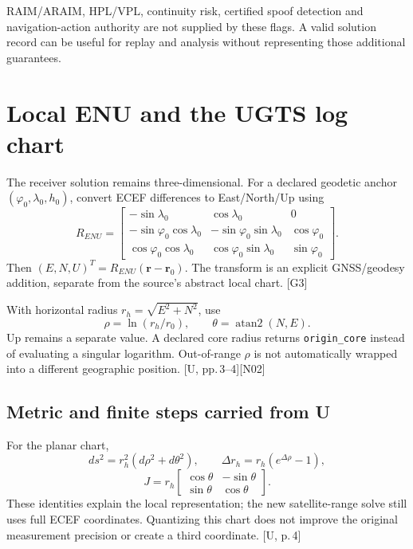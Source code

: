 \documentclass[11pt,a4paper]{article}
\newcommand{\code}[1]{\texttt{#1}}
\newcommand{\src}[1]{\textcolor{muted}{[U, #1]}}
\newcommand{\ext}[1]{\textcolor{muted}{[#1]}}
\newcommand{\dec}[1]{\textcolor{accent}{[N#1]}}
\begin{document}
RAIM/ARAIM, HPL/VPL, continuity risk, certified spoof detection and navigation-action
authority are not supplied by these flags. A valid solution record can be useful for
replay and analysis without representing those additional guarantees.
\clearpage
\section{Local ENU and the UGTS log chart}
The receiver solution remains three-dimensional. For a declared geodetic anchor
$(\varphi_0,\lambda_0,h_0)$, convert ECEF differences to East/North/Up using
\begin{equation}
R_{ENU}=\begin{bmatrix}
-\sin\lambda_0&\cos\lambda_0&0\\
-\sin\varphi_0\cos\lambda_0&-\sin\varphi_0\sin\lambda_0&\cos\varphi_0\\
\cos\varphi_0\cos\lambda_0&\cos\varphi_0\sin\lambda_0&\sin\varphi_0
\end{bmatrix}.
\end{equation}
Then $(E,N,U)^T=R_{ENU}(\boldsymbol r-\boldsymbol r_0)$. The transform is an explicit
GNSS/geodesy addition, separate from the source's abstract local chart. \ext{G3}

With horizontal radius $r_h=\sqrt{E^2+N^2}$, use
\begin{equation}
\rho=\ln(r_h/r_0),\qquad\theta=\operatorname{atan2}(N,E).
\end{equation}
Up remains a separate value. A declared core radius returns \code{origin\_core}
instead of evaluating a singular logarithm. Out-of-range $\rho$ is not automatically
wrapped into a different geographic position. \src{pp.\,3--4}\dec{02}

\subsection{Metric and finite steps carried from U}
For the planar chart,
\begin{equation}
ds^2=r_h^2(d\rho^2+d\theta^2),\qquad
\Delta r_h=r_h(e^{\Delta\rho}-1),
\end{equation}
\begin{equation}
J=r_h\begin{bmatrix}\cos\theta&-\sin\theta\\\sin\theta&\cos\theta\end{bmatrix}.
\end{equation}
These identities explain the local representation; the new satellite-range solve
still uses full ECEF coordinates. Quantizing this chart does not improve the original
measurement precision or create a third coordinate. \src{p.\,4}
\end{document}
